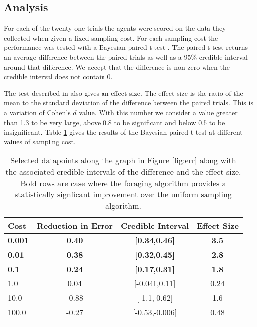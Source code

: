 \subsection{Analysis}

For each of the twenty-one trials the agents were scored on the data they collected when given a fixed sampling cost.  For each sampling cost the performance was tested with a Bayesian paired t-test \cite{baath2014bayesian}.  The paired t-test returns an average difference between the paired trials as well as a 95\% credible interval around that difference.  We accept that the difference is non-zero when the credible interval does not contain 0.  

The test described in \cite{baath2015bayesian} also gives an effect size.  The effect size is the ratio of the mean to the standard deviation of the difference between the paired trials.  This is a variation of Cohen's $d$ value\cite{cohen2013statistical}.  With this number we consider a value greater than 1.3 to be very large, above 0.8 to be significant and below 0.5 to be insignificant.  Table \ref{tbl:ttest} gives the results of the Bayesian paired t-test at different values of sampling cost.

\begin{table}[htpd!]
	\centering
	\begin{tabular}{lccc}
		Cost & Reduction in Error & Credible Interval & Effect Size \\
		\hline
		\textbf{0.001} & \textbf{0.40} & \textbf{[0.34,0.46]} & \textbf{3.5}\\
		\textbf{0.01} & \textbf{0.38} & \textbf{[0.32,0.45]} & \textbf{2.8}\\
		\textbf{0.1} & \textbf{0.24} & \textbf{[0.17,0.31]} & \textbf{1.8}\\
		1.0 & 0.04 & [-0.041,0.11] & 0.24\\
		10.0 & -0.88 & [-1.1,-0.62] & 1.6\\
		100.0 & -0.27 & [-0.53,-0.006] & 0.48\\
		\hline \\
	\end{tabular}
	\caption{Selected datapoints along the graph in Figure \ref{fig:err} along with the associated credible intervals of the difference and the effect size.  Bold rows are case where the foraging algorithm provides a statistically signficant improvement over the uniform sampling algorithm.}
	\label{tbl:ttest}
\end{table}
